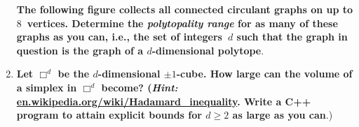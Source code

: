 \documentclass[11pt]{amsart}
\begin{document}
\begin{enumerate}
\textbf{The following figure collects all connected circulant graphs on up to $8$~vertices. Determine the \emph{polytopality range} for as many of these graphs as you can, i.e., the set of integers~$d$ such that the graph in question is the graph of a $d$-dimensional polytope}.

\bigskip


\item \textbf{Let $\Box^d$ be the $d$-dimensional $\pm1$-cube. How large can the volume of a simplex in $\Box^d$ become? (\emph{Hint:} \url{en.wikipedia.org/wiki/Hadamard_inequality}. Write a  C++ program to attain explicit bounds for $d\ge2$ as large as you can}.)
\end{enumerate}


\end{document}
